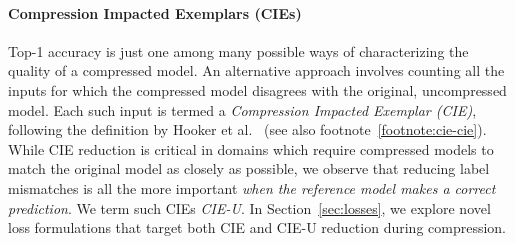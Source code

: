 \paragraph{Compression Impacted Exemplars (CIEs)}

Top-1 accuracy is just one among many possible ways of characterizing the quality of a compressed model. An alternative approach involves counting all the inputs for which the compressed model disagrees with the original, uncompressed model. Each such input is termed a {\em Compression Impacted Exemplar (CIE)}, following the definition by Hooker et al.~\cite{hooker2020characterising} (see also footnote~\ref{footnote:cie-cie}). %
While CIE reduction is critical in domains which require compressed models to match the original model as closely as possible,
we observe that reducing label mismatches is all the more important {\em when the reference model makes a correct prediction}. We term such CIEs {\em CIE-U}. In Section~\ref{sec:losses}, we explore novel loss formulations that target both CIE and CIE-U reduction during compression.




